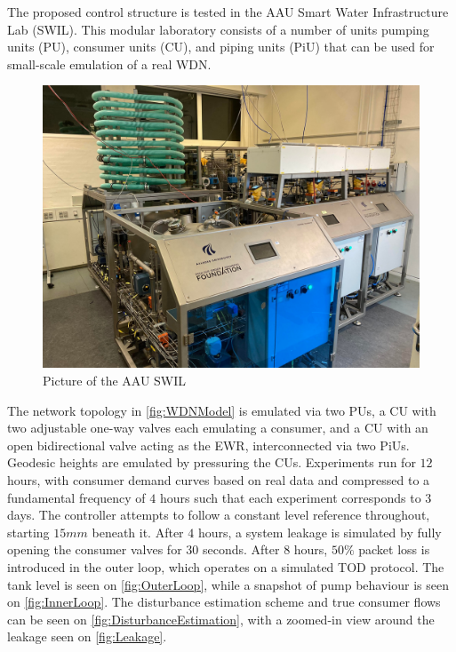 The proposed control structure is tested in the AAU Smart Water Infrastructure Lab (SWIL). This modular laboratory consists of a number of units pumping units (PU), consumer units (CU), and piping units (PiU) that can be used for small-scale emulation of a real WDN.

\begin{figure}[h!]
	\includegraphics[width=\linewidth]{Pictures/SWIL.pdf}
	\caption{Picture of the AAU SWIL}
	\label{fig:AAUSWIL}
\end{figure}

The network topology in \cref{fig:WDNModel} is emulated via two PUs, a CU with two adjustable one-way valves each emulating a consumer, and a CU with an open bidirectional valve acting as the EWR, interconnected via two PiUs. Geodesic heights are emulated by pressuring the CUs. Experiments run for $12$ hours, with consumer demand curves based on real data and compressed to a fundamental frequency of $4$ hours such that each experiment corresponds to $3$ days. The controller attempts to follow a constant level reference throughout, starting $15 \si{mm}$ beneath it. After $4$ hours, a system leakage is simulated by fully opening the consumer valves for $30$ seconds. After $8$ hours, $50\%$ packet loss is introduced in the outer loop, which operates on a simulated TOD protocol. The tank level is seen on \cref{fig:OuterLoop}, while a snapshot of pump behaviour is seen on \cref{fig:InnerLoop}. The disturbance estimation scheme and true consumer flows can be seen on \cref{fig:DisturbanceEstimation}, with a zoomed-in view around the leakage seen on \cref{fig:Leakage}.

